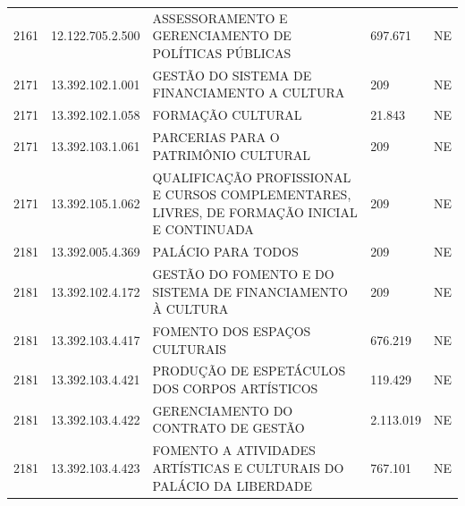 \documentclass{article}
\begin{document}
\begin{longtable}[c]{m{1cm}|m{2cm}|m{10cm}|m{2cm}|m{1cm}}
\multicolumn{1}{C{1cm}|}{2161} & \multicolumn{1}{C{2cm}|}{12.122.705.2.500} & \multicolumn{1}{L{10cm}|}{ASSESSORAMENTO E GERENCIAMENTO DE POLÍTICAS PÚBLICAS} & \multicolumn{1}{R{2cm}|}{697.671} & \multicolumn{1}{C{1cm}}{NE} \\
\multicolumn{1}{C{1cm}|}{2171} & \multicolumn{1}{C{2cm}|}{13.392.102.1.001} & \multicolumn{1}{L{10cm}|}{GESTÃO DO SISTEMA DE FINANCIAMENTO A CULTURA} & \multicolumn{1}{R{2cm}|}{209} & \multicolumn{1}{C{1cm}}{NE} \\
\multicolumn{1}{C{1cm}|}{2171} & \multicolumn{1}{C{2cm}|}{13.392.102.1.058} & \multicolumn{1}{L{10cm}|}{FORMAÇÃO CULTURAL} & \multicolumn{1}{R{2cm}|}{21.843} & \multicolumn{1}{C{1cm}}{NE} \\
\multicolumn{1}{C{1cm}|}{2171} & \multicolumn{1}{C{2cm}|}{13.392.103.1.061} & \multicolumn{1}{L{10cm}|}{PARCERIAS PARA O PATRIMÔNIO CULTURAL} & \multicolumn{1}{R{2cm}|}{209} & \multicolumn{1}{C{1cm}}{NE} \\
\multicolumn{1}{C{1cm}|}{2171} & \multicolumn{1}{C{2cm}|}{13.392.105.1.062} & \multicolumn{1}{L{10cm}|}{QUALIFICAÇÃO PROFISSIONAL E CURSOS COMPLEMENTARES, LIVRES, DE FORMAÇÃO INICIAL E CONTINUADA} & \multicolumn{1}{R{2cm}|}{209} & \multicolumn{1}{C{1cm}}{NE} \\
\multicolumn{1}{C{1cm}|}{2181} & \multicolumn{1}{C{2cm}|}{13.392.005.4.369} & \multicolumn{1}{L{10cm}|}{PALÁCIO PARA TODOS} & \multicolumn{1}{R{2cm}|}{209} & \multicolumn{1}{C{1cm}}{NE} \\
\multicolumn{1}{C{1cm}|}{2181} & \multicolumn{1}{C{2cm}|}{13.392.102.4.172} & \multicolumn{1}{L{10cm}|}{GESTÃO DO FOMENTO E DO SISTEMA DE FINANCIAMENTO À CULTURA} & \multicolumn{1}{R{2cm}|}{209} & \multicolumn{1}{C{1cm}}{NE} \\
\multicolumn{1}{C{1cm}|}{2181} & \multicolumn{1}{C{2cm}|}{13.392.103.4.417} & \multicolumn{1}{L{10cm}|}{FOMENTO DOS ESPAÇOS CULTURAIS} & \multicolumn{1}{R{2cm}|}{676.219} & \multicolumn{1}{C{1cm}}{NE} \\
\multicolumn{1}{C{1cm}|}{2181} & \multicolumn{1}{C{2cm}|}{13.392.103.4.421} & \multicolumn{1}{L{10cm}|}{PRODUÇÃO DE ESPETÁCULOS DOS CORPOS ARTÍSTICOS} & \multicolumn{1}{R{2cm}|}{119.429} & \multicolumn{1}{C{1cm}}{NE} \\
\multicolumn{1}{C{1cm}|}{2181} & \multicolumn{1}{C{2cm}|}{13.392.103.4.422} & \multicolumn{1}{L{10cm}|}{GERENCIAMENTO DO CONTRATO DE GESTÃO} & \multicolumn{1}{R{2cm}|}{2.113.019} & \multicolumn{1}{C{1cm}}{NE} \\
\multicolumn{1}{C{1cm}|}{2181} & \multicolumn{1}{C{2cm}|}{13.392.103.4.423} & \multicolumn{1}{L{10cm}|}{FOMENTO A ATIVIDADES ARTÍSTICAS E CULTURAIS DO PALÁCIO DA LIBERDADE} & \multicolumn{1}{R{2cm}|}{767.101} & \multicolumn{1}{C{1cm}}{NE} \\

\end{longtable}
\end{document}
